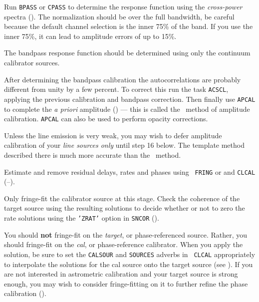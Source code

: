 Run {\tt BPASS} or {\tt CPASS} to determine the 
response function using the {\it cross-power} spectra ().
The normalization should be over the full bandwidth, be careful because
the default channel selection is the inner 75\% of the band.  If you
use the inner 75\%, it can lead to amplitude errors of up to 15\%.

 The bandpass response function should be
determined using only the continuum calibrator sources.  

After determining the bandpass calibration  the autocorrelations are
probably different from unity by a few percent.  To correct this run
the task {\tt ACSCL}, applying the previous calibration and bandpass
correction.  Then finally use {\tt {APCAL}} to complete the {\it a
priori\/} amplitude  () --- this is
called the \Tsys\ method of amplitude calibration.  {\tt APCAL} can
also be used to perform opacity corrections.

Unless the line emission is very weak, you may wish to defer amplitude
calibration of your {\it line sources only\/} until step 16 below.  The
template method described there is much more accurate than the
\Tsys\ method.

Estimate and remove residual delays, rates and phases using {\tt
FRING} or {\tt {}}  and {\tt CLCAL}
(--).

Only fringe-fit the calibrator source at this stage.  Check the
coherence of the target source using the resulting solutions to decide
whether or not to zero the rate solutions using the {\tt 'ZRAT'}
option in {\tt SNCOR} ().

You should {\bf not} fringe-fit on the {\it target\/}, or
phase-referenced source.  Rather, you should fringe-fit on the {\it
cal\/}, or phase-reference calibrator.  When you apply the solution,
be sure to set the {\tt CALSOUR} and {\tt SOURCES} adverbs in {\tt
CLCAL} appropriately to interpolate the solutions for the cal source
onto the target source (see ).  If you are not interested
in astrometric calibration and your target source is strong enough,
you may wish to consider fringe-fitting on it to further refine the
phase calibration ().

